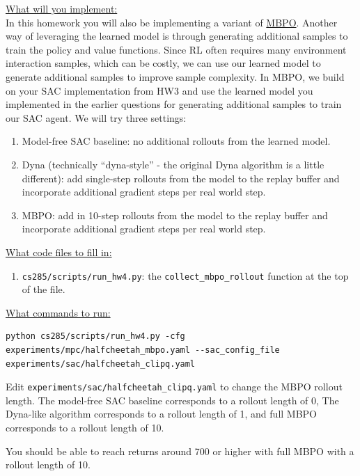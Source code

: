 \documentclass{article} %
\begin{document}
\underline{What will you implement:}\\ 

In this homework you will also be implementing a variant of \href{https://arxiv.org/pdf/1906.08253}{MBPO}. Another way of leveraging the learned model is through generating additional samples to train the policy and value functions. Since RL often requires many environment interaction samples, which can be costly, we can use our learned model to generate additional samples to improve sample complexity. In MBPO, we build on your SAC implementation from HW3 and use the learned model you implemented in the earlier questions for generating additional samples to train our SAC agent. We will try three settings:
\begin{enumerate}
    \item Model-free SAC baseline: no additional rollouts from the learned model.
    \item Dyna (technically ``dyna-style'' - the original Dyna algorithm is a little different): add single-step rollouts from the model to the replay buffer and incorporate additional gradient steps per real world step. 
    \item MBPO: add in 10-step rollouts from the model to the replay buffer and incorporate additional gradient steps per real world step. 
\end{enumerate}

\underline{What code files to fill in:}
\begin{enumerate}
    \item \verb+cs285/scripts/run_hw4.py+: the \verb+collect_mbpo_rollout+ function at the top of the file.
\end{enumerate}

\underline{What commands to run:}\\
\begin{lstlisting}[escapechar=@]
python cs285/scripts/run_hw4.py -cfg experiments/mpc/halfcheetah_mbpo.yaml --sac_config_file experiments/sac/halfcheetah_clipq.yaml
\end{lstlisting}

Edit \verb+experiments/sac/halfcheetah_clipq.yaml+ to change the MBPO rollout length. The model-free SAC baseline corresponds to a rollout length of 0, The Dyna-like algorithm corresponds to a rollout length of 1, and full MBPO corresponds to a rollout length of 10.

You should be able to reach returns around 700 or higher with full MBPO with a rollout length of 10.
\end{document}
